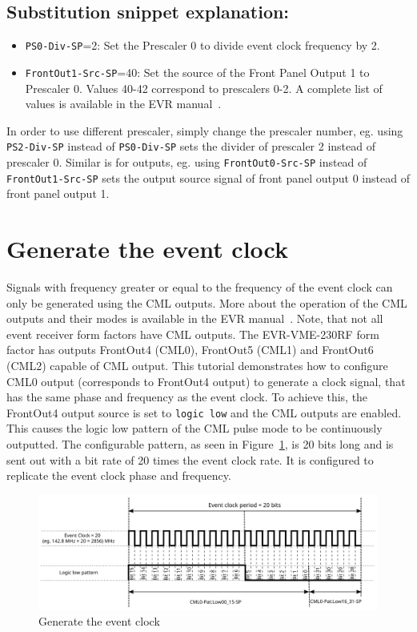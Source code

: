\documentclass[12pt,a4paper]{article}
\begin{document}
\subsection{Substitution snippet explanation:}\label{sec:explain_clock}
\begin{itemize}
	\item \texttt{PS0-Div-SP}=2: Set the Prescaler 0 to divide event clock frequency by 2.
	\item \texttt{FrontOut1-Src-SP}=40: Set the source of the Front Panel Output 1 to Prescaler 0. Values 40-42 correspond to prescalers 0-2. A complete list of values is available in the EVR manual~\cite{evr_manual}.
\end{itemize}

In order to use different prescaler, simply change the prescaler number, eg. using \texttt{PS2-Div-SP} instead of \texttt{PS0-Div-SP} sets the divider of prescaler 2 instead of prescaler 0.
Similar is for outputs, eg. using \texttt{FrontOut0-Src-SP} instead of \texttt{FrontOut1-Src-SP} sets the output source signal of front panel output 0 instead of front panel output 1.

\section{Generate the event clock}\label{sec:generate_event_clock}
Signals with frequency greater or equal to the frequency of the event clock can only be generated using the CML outputs. More about the operation of the CML outputs and their modes is available in the EVR manual~\cite{evr_manual}. Note, that not all event receiver form factors have CML outputs. The EVR-VME-230RF form factor has outputs FrontOut4 (CML0), FrontOut5 (CML1) and FrontOut6 (CML2) capable of CML output. This tutorial demonstrates how to configure CML0 output (corresponds to FrontOut4 output) to generate a clock signal, that has the same phase and frequency as the event clock. To achieve this, the FrontOut4 output source is set to \texttt{logic low} and the CML outputs are enabled. This causes the logic low pattern of the CML pulse mode to be continuously outputted. The configurable pattern, as seen in Figure~\ref{fig:gen_evt_clk}, is 20 bits long and is sent out with a bit rate of 20 times the event clock rate. It is configured to replicate the event clock phase and frequency.

\begin{figure}[H]
	\centering
	\includegraphics[width=\columnwidth]{./img/gen_evt_clk}
	\caption{Generate the event clock}
	\label{fig:gen_evt_clk}
\end{figure}
\end{document}
